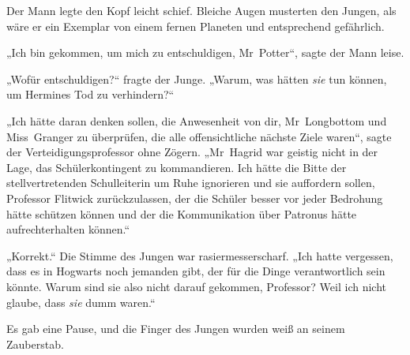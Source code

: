 Der Mann legte den Kopf leicht schief. Bleiche Augen musterten den Jungen, als wäre er ein Exemplar von einem fernen Planeten und entsprechend gefährlich.

„Ich bin gekommen, um mich zu entschuldigen, Mr~Potter“, sagte der Mann leise.

„Wofür entschuldigen?“ fragte der Junge.
„Warum, was hätten \emph{sie} tun können, um Hermines Tod zu verhindern?“

„Ich hätte daran denken sollen, die Anwesenheit von dir, Mr~Longbottom und Miss~Granger zu überprüfen, die alle offensichtliche nächste Ziele waren“, sagte der Verteidigungsprofessor ohne Zögern.
„Mr~Hagrid war geistig nicht in der Lage, das Schülerkontingent zu kommandieren. Ich hätte die Bitte der stellvertretenden Schulleiterin um Ruhe ignorieren und sie auffordern sollen, Professor Flitwick zurückzulassen, der die Schüler besser vor jeder Bedrohung hätte schützen können und der die Kommunikation über Patronus hätte aufrechterhalten können.“

„Korrekt.“ Die Stimme des Jungen war rasiermesserscharf.
„Ich hatte vergessen, dass es in Hogwarts noch jemanden gibt, der für die Dinge verantwortlich sein könnte. Warum sind sie also nicht darauf gekommen, Professor? Weil ich nicht glaube, dass \emph{sie} dumm waren.“

Es gab eine Pause, und die Finger des Jungen wurden weiß an seinem Zauberstab.

